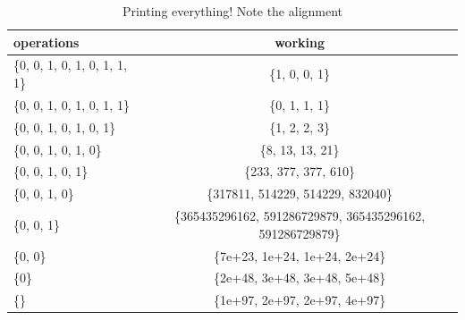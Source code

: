 \documentclass{article}
\begin{document}
\begin{table}
\centering
\begin{tabular}{ l | c }
\hline
 \textbf{operations} & \textbf{working}  \\ 
 \hline
 \{0, 0, 1, 0, 1, 0, 1, 1, 1\} & \{1, 0, 0, 1\}  \\  
 \hline
 \{0, 0, 1, 0, 1, 0, 1, 1\} & \{0, 1, 1, 1\} \\
 \hline
 \{0, 0, 1, 0, 1, 0, 1\} & \{1, 2, 2, 3\} \\
 \hline
 \{0, 0, 1, 0, 1, 0\} & \{8, 13, 13, 21\} \\
 \hline
 \{0, 0, 1, 0, 1\} &  \{233, 377, 377, 610\}  \\
 \hline
 \{0, 0, 1, 0\} & \{317811, 514229, 514229, 832040\} \\
 \hline
 \{0, 0, 1\} & \{365435296162, 591286729879, 365435296162, 591286729879\} \\
 \hline
 \{0, 0\} & \{7e+23,
    1e+24, 1e+24, 2e+24\} \\
 \hline
 \{0\} & \{2e+48,
    3e+48, 3e+48, 5e+48\} \\
 \hline
 \{\} & \{1e+97,
    2e+97, 2e+97, 4e+97\} \\
 \hline
\end{tabular}
\caption{Printing everything! Note the alignment}
\end{table}

\clearpage
\newpage 


\end{document}
